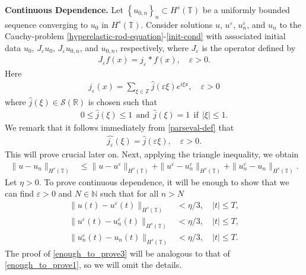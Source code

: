 \documentclass[12pt,reqno]{amsart}
\newcommand{\rr}{\mathbb{R}}
\newcommand{\zz}{\mathbb{Z}}
\newcommand{\ci}{\mathbb{T}}
\newcommand{\ee}{\varepsilon}
\theoremstyle{plain}  %
\theoremstyle{definition}
\begin{document}
{\bf Continuous Dependence.}
Let $\left\{ u_{0, n} \right\}_n \subset H^s(\ci)$ be a uniformly bounded
sequence converging to $u_0$ in $H^s(\ci)$.
Consider solutions $u $, $u^\ee$, $u^\ee_n$, and $u_n$ to the 
Cauchy-problem
\eqref{hyperelastic-rod-equation}-\eqref{init-cond}
with associated initial data $u_0$, $J_\ee u_0$,
$J_\ee u_{0,n}$, and $u_{0,n}$, respectively, where $J_\ee$ is the operator 
defined by
\begin{equation}
\label{0'u}
\begin{split}
J_\ee f(x) = j_\ee * f(x), \quad \ee>0.
\end{split}
\end{equation}
%
%
Here
\begin{equation}
\begin{split}
j_\ee (x) = \sum_{\xi \in \zz}
\widehat{j}(\ee \xi) e^{i \xi x}, \quad \ee > 0
\label{parseval-def}
\end{split}
\end{equation}
where $\widehat{j}(\xi) \in \mathcal{S}(\rr)$ is chosen such that 
%
\begin{equation}
\label{0u}
\begin{split}
	 0 \le \widehat{j}(\xi) \le 1  \ \ \text{and} \ \
 \widehat{j}(\xi) = 1 \ \ \text{if} \ \ |\xi| \le 1.
\end{split}
\end{equation}
%
%
%
%
%
%
%
%
%
%
We remark that it follows immediately from \eqref{parseval-def} that
\begin{equation}
\begin{split}
	\widehat{j_\ee}(\xi)  = \widehat{j }(\ee \xi), \quad \ee > 0.
\label{widehat-def}
\end{split}
\end{equation}
This will prove
crucial later on.
%
Next, applying
the triangle inequality, we obtain
%
%
\begin{equation*}
\begin{split}
\|u - u_n\|_{H^s(\ci)}
& \le \|u - u^\ee\|_{H^s(\ci)}
+ \|u^\ee - u^{\ee}_n \|_{H^s(\ci) }
+  \|u^{\ee}_n - u_n \|_{H^s(\ci)}.
\end{split}
\end{equation*}
%
%
Let $\eta > 0$. To prove continuous dependence, it will be enough to show that 
we can find $\ee > 0$ and $N \in \mathbb{N}$ such that for all $n > N$ 
\begin{align}
	 \|u(t) - u^\ee(t)\|_{H^s(\ci)}
	& < \eta/3, \quad |t| \le T,
\label{enough_to_prove1}
\\
  \|u^\ee(t) - u^{\ee}_n(t)
\|_{H^s(\ci)} & < \eta/3, \quad |t| \le T,
\label{enough_to_prove2}
\\
  \|u^{\ee}_n(t) - u_n(t) \|_{H^s(\ci)} & < \eta/3, \quad |t| \le T.
\label{enough_to_prove3}
\end{align}
%
%
The proof of \eqref{enough_to_prove3} will be analogous to that of 
\eqref{enough_to_prove1}, so we will omit the details.
%
%
%
%
\end{document}

